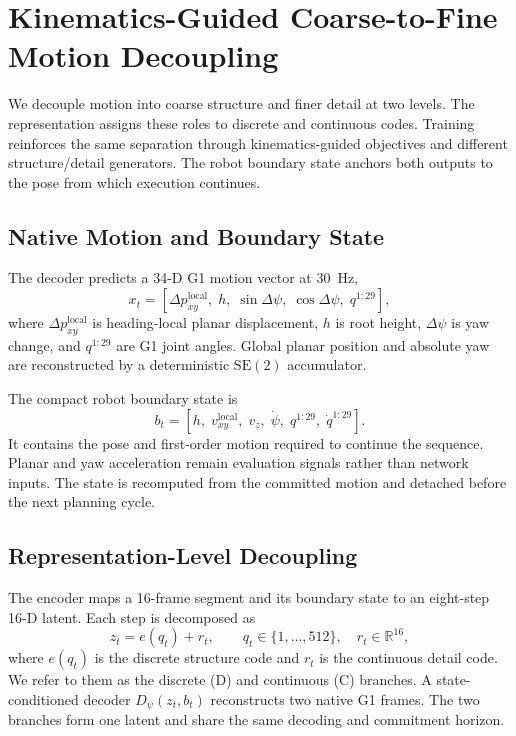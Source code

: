 \documentclass[conference]{IEEEtran}
\begin{document}
\section{Kinematics-Guided Coarse-to-Fine Motion Decoupling}
We decouple motion into coarse structure and finer detail at two levels. The representation assigns these roles to discrete and continuous codes. Training reinforces the same separation through kinematics-guided objectives and different structure/detail generators. The robot boundary state anchors both outputs to the pose from which execution continues.
\subsection{Native Motion and Boundary State}
The decoder predicts a 34-D G1 motion vector at 30~Hz,
\begin{equation}
    x_t = [\Delta p^{\mathrm{local}}_{xy},\; h,\;
    \sin \Delta\psi,\;\cos \Delta\psi,\;q^{1:29}],
    \label{eq:g1_motion}
\end{equation}
where $\Delta p^{\mathrm{local}}_{xy}$ is heading-local planar displacement, $h$ is root height, $\Delta\psi$ is yaw change, and $q^{1:29}$ are G1 joint angles. Global planar position and absolute yaw are reconstructed by a deterministic $\mathrm{SE}(2)$ accumulator.

The compact robot boundary state is
\begin{equation}
    b_t=[h,\;v^{\mathrm{local}}_{xy},\;v_z,\;\dot{\psi},\;
    q^{1:29},\;\dot{q}^{1:29}].
    \label{eq:boundary_state}
\end{equation}
It contains the pose and first-order motion required to continue the sequence. Planar and yaw acceleration remain evaluation signals rather than network inputs. The state is recomputed from the committed motion and detached before the next planning cycle.

\subsection{Representation-Level Decoupling}
The encoder maps a 16-frame segment and its boundary state to an eight-step 16-D latent. Each step is decomposed as
\begin{equation}
    z_t=e(q_t)+r_t,
    \qquad q_t\in\{1,\ldots,512\},\quad r_t\in\mathbb{R}^{16},
    \label{eq:dc_latent}
\end{equation}
where $e(q_t)$ is the discrete structure code and $r_t$ is the continuous detail code. We refer to them as the discrete (D) and continuous (C) branches. A state-conditioned decoder $D_\psi(z_t,b_t)$ reconstructs two native G1 frames. The two branches form one latent and share the same decoding and commitment horizon.
\end{document}
